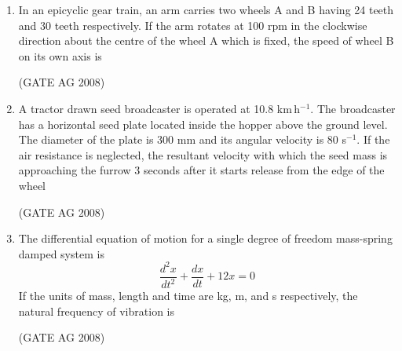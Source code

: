 \documentclass[journal,12pt,onecolumn]{IEEEtran}
\begin{document}
\begin{enumerate}
\medskip

\item 
 In an epicyclic gear train, an arm carries two wheels A and B having 24 teeth and 30 teeth respectively. If the arm rotates at 100 rpm in the clockwise direction about the centre of the wheel A which is fixed, the speed of wheel B on its own axis is
\begin{enumerate}
\end{enumerate}
\hfill(GATE AG 2008)\\

\medskip

\item 
 A tractor drawn seed broadcaster is operated at 10.8 km\,h$^{-1}$. The broadcaster has a horizontal seed plate located inside the hopper above the ground level. The diameter of the plate is 300 mm and its angular velocity is 80 s$^{-1}$. If the air resistance is neglected, the resultant velocity with which the seed mass is approaching the furrow 3 seconds after it starts release from the edge of the wheel
\begin{enumerate}
\end{enumerate}
\hfill(GATE AG 2008)\\

\medskip

\item 
 The differential equation of motion for a single degree of freedom mass-spring damped system is
\[
\frac{d^2 x}{dt^2} + \frac{d x}{dt} + 12 x = 0
\]
If the units of mass, length and time are kg, m, and s respectively, the natural frequency of vibration is
\begin{enumerate}
\end{enumerate}
\hfill(GATE AG 2008)\\


\end{enumerate}
\end{document}
